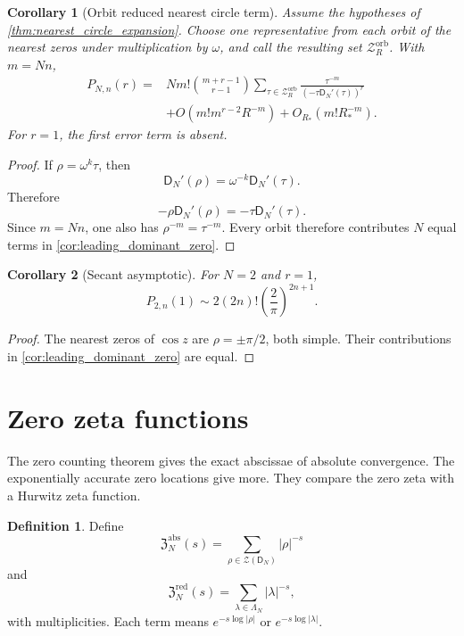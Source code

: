 \documentclass[11pt]{article}
\newtheorem{corollary}[corollary]{Corollary}
\theoremstyle{definition}
\newtheorem{definition}[definition]{Definition}
\theoremstyle{remark}
\newcommand{\Zcal}{\mathcal Z}
\newcommand{\Dfun}{\mathsf D}
\begin{document}
\begin{corollary}[Orbit reduced nearest circle term]\label{cor:orbit_reduced_asymptotic}
Assume the hypotheses of \cref{thm:nearest_circle_expansion}.  Choose one representative from each orbit of the nearest zeros under multiplication by $\omega$, and call the resulting set $\Zcal_R^{\mathrm{orb}}$.  With $m=Nn$,
\[
\begin{aligned}
P_{N,n}(r)
={}&N m!\binom{m+r-1}{r-1}
\sum_{\tau\in\Zcal_R^{\mathrm{orb}}}
\frac{\tau^{-m}}{(-\tau\Dfun_N'(\tau))^r}
\\
&+O\left(m!m^{r-2}R^{-m}\right)
+O_{R_*}\left(m!R_*^{-m}\right).
\end{aligned}
\]
For $r=1$, the first error term is absent.
\end{corollary}

\begin{proof}
If $\rho=\omega^k\tau$, then
\[
\Dfun_N'(\rho)=\omega^{-k}\Dfun_N'(\tau).
\]
Therefore
\[
-\rho\Dfun_N'(\rho)
=-\tau\Dfun_N'(\tau).
\]
Since $m=Nn$, one also has $\rho^{-m}=\tau^{-m}$.  Every orbit therefore contributes $N$ equal terms in \cref{cor:leading_dominant_zero}.
\end{proof}

\begin{corollary}[Secant asymptotic]\label{cor:secant_asymptotic}
For $N=2$ and $r=1$,
\[
P_{2,n}(1)
\sim
2(2n)!\left(\frac2\pi\right)^{2n+1}.
\]
\end{corollary}

\begin{proof}
The nearest zeros of $\cos z$ are $\rho=\pm\pi/2$, both simple.  Their contributions in \cref{cor:leading_dominant_zero} are equal.
\end{proof}

\section{Zero zeta functions}\label{sec:zero_zeta}

The zero counting theorem gives the exact abscissae of absolute convergence.  The exponentially accurate zero locations give more.  They compare the zero zeta with a Hurwitz zeta function.

\begin{definition}\label{def:absolute_zero_zetas}
Define
\[
\mathfrak Z_N^{\mathrm{abs}}(s)
=
\sum_{\rho\in\Zcal(\Dfun_N)}|\rho|^{-s}
\]
and
\[
\mathfrak Z_N^{\mathrm{red}}(s)
=
\sum_{\lambda\in\Lambda_N}|\lambda|^{-s},
\]
with multiplicities.  Each term means $e^{-s\log|\rho|}$ or $e^{-s\log|\lambda|}$.
\end{definition}
\end{document}

